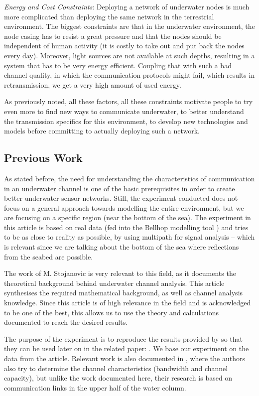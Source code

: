 \documentclass[a4paper]{IEEEtran}
\begin{document}
\textit{Energy and Cost Constraints}: Deploying a network of underwater nodes is
much more complicated than deploying the same network in the terrestrial
environment. The biggest constraints are that in the underwater environment, the
node casing has to resist a great pressure and that the nodes should be
independent of human activity (it is costly to take out and put back the nodes
every day). Moreover, light sources are not available at such depths, resulting
in a system that has to be very energy efficient. Coupling that with such a bad
channel quality, in which the communication protocols might fail, which results
in retransmission, we get a very high amount of used energy.

As previously noted, all these factors, all these constraints motivate people to
try even more to find new ways to communicate underwater, to better understand
the transmission specifics for this environment, to develop new technologies and
models before committing to actually deploying such a network.

\subsection{Previous Work}
As stated before, the need for understanding the characteristics of
communication in an underwater channel is one of the basic prerequisites in
order to create better underwater sensor networks. Still, the experiment
conducted does not focus on a general approach towards modelling the entire
environment, but we are focusing on a specific region (near the bottom of the
sea). The experiment in this article is based on real data (fed into the Bellhop
modelling tool \cite{bellhop}) and tries to be as close to reality as possible,
by using multipath for signal analysis -- which is relevant since we are talking
about the bottom of the sea where reflections from the seabed are possible.

The work of M. Stojanovic \cite{stojanovic} is very relevant to this field, as
it documents the theoretical background behind underwater channel analysis. This
article synthesises the required mathematical background, as well as channel
analysis knowledge. Since this article is of high relevance in the field and is
acknowledged to be one of the best, this allows us to use the theory and
calculations documented to reach the desired results.

The purpose of the experiment is to reproduce the results provided by
\cite{book} so that they can be used later on in the related paper: \cite{nds}.
We base our experiment on the data from the article. Relevant work is also
documented in \cite{hayward}, where the authors also try to determine the
channel characteristics (bandwidth and channel capacity), but unlike the work
documented here, their research is based on communication links in the upper
half of the water column.
\end{document}
